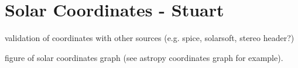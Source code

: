 \section{Solar Coordinates - Stuart}
validation of coordinates with other sources (e.g. spice, solarsoft, stereo header?)

figure of solar coordinates graph (see astropy coordinates graph for example).

